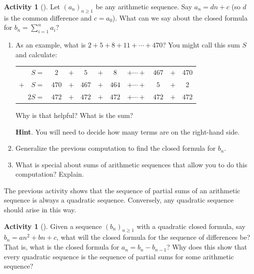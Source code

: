 \documentclass[10pt,]{book}
\theoremstyle{plain}
\theoremstyle{definition}
\theoremstyle{definition}
\theoremstyle{definition}
\newtheorem{activity}[project]{Activity}
\theoremstyle{definition}
\numberwithin{equation}{chapter}
\newcommand{\hrulethin}  {\noalign{\hrule height 0.04em}}
\begin{document}
\begin{activity}[]\label{activity-89}
\hypertarget{p-842}{}%
Let \((a_n)_{n \ge 1}\) be any arithmetic sequence.  Say \(a_n = dn + c\) (so \(d\) is the common difference and \(c = a_0\)).  What can we say about the closed formula for \(b_n = \sum_{i=1}^n a_i\)?%
\begin{enumerate}[font=\bfseries,label=(\alph*),ref=\alph*]
\item\label{task-108} \hypertarget{p-843}{}%
As an example, what is \(2+5+8+11+\cdots + 470\)?  You might call this sum \(S\) and calculate:%
\begin{sidebyside}{1}{0}{0}{0}
\begin{sbspanel}{1}
{\centering%
\begin{tabular}{rccccccccc}
\(S  =\)&\(2\)&\(+\)&\(5\)&\(+\)&\(8\)&\(+ \cdots +\)&\(467\)&\(+\)&470\tabularnewline[0pt]
\(+ \quad S  =\)&\(470\)&\(+\)&\(467\)&\(+\)&\(464\)&\(+ \cdots +\)&\(5\)&\(+\)&2\tabularnewline\hrulethin
\(2S  =\)&\(472\)&\(+\)&\(472\)&\(+\)&\(472\)&\(+ \cdots +\)&\(472\)&\(+\)&\(472\)
\end{tabular}
\par}
\end{sbspanel}
\end{sidebyside}
\par
\hypertarget{p-844}{}%
Why is that helpful?  What is the sum?%
\par\smallskip%
\noindent\textbf{Hint}.\hypertarget{hint-82}{}\quad%
\hypertarget{p-845}{}%
You will need to decide how many terms are on the right-hand side.%
\item\label{task-109} \hypertarget{p-846}{}%
Generalize the previous computation to find the closed formula for \(b_n\).%
\item\label{task-110} \hypertarget{p-847}{}%
What is special about sums of arithmetic sequences that allow you to do this computation?  Explain.%
\end{enumerate}
\end{activity}
\hypertarget{p-848}{}%
The previous activity shows that the sequence of partial sums of an arithmetic sequence is always a quadratic sequence.  Conversely, any quadratic sequence should arise in this way.%
\begin{activity}[]\label{activity-90}
\hypertarget{p-849}{}%
Given a sequence \((b_n)_{n \ge 1}\) with a quadratic closed formula, say \(b_n = an^2 + bn + c\), what will the closed formula for the sequence of differences be?  That is, what is the closed formula for \(a_n = b_n - b_{n-1}\)?  Why does this show that every quadratic sequence is the sequence of partial sums for some arithmetic sequence?%
\end{activity}
\end{document}
